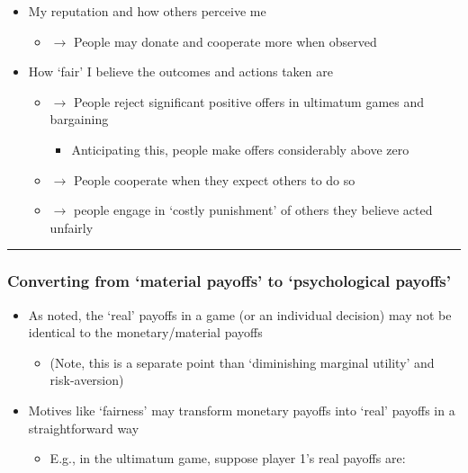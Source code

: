 \documentclass[]{article}
\providecommand{\tightlist}{%
  \setlength{\itemsep}{0pt}\setlength{\parskip}{0pt}}
\begin{document}
\begin{itemize}
\tightlist
\item
  My reputation and how others perceive me

  \begin{itemize}
  \tightlist
  \item
    \(\rightarrow\) People may donate and cooperate more when observed
  \end{itemize}
\item
  How `fair' I believe the outcomes and actions taken are

  \begin{itemize}
  \tightlist
  \item
    \(\rightarrow\) People reject significant positive offers in ultimatum games and bargaining

    \begin{itemize}
    \tightlist
    \item
      Anticipating this, people make offers considerably above zero
    \end{itemize}
  \item
    \(\rightarrow\) People cooperate when they expect others to do so
  \item
    \(\rightarrow\) people engage in `costly punishment' of others they believe acted unfairly
  \end{itemize}
\end{itemize}

\begin{center}\rule{0.5\linewidth}{\linethickness}\end{center}

\hypertarget{converting-from-material-payoffs-to-psychological-payoffs}{%
\subsubsection{Converting from `material payoffs' to `psychological payoffs'}\label{converting-from-material-payoffs-to-psychological-payoffs}}

\begin{itemize}
\tightlist
\item
  As noted, the `real' payoffs in a game (or an individual decision) may not be identical to the monetary/material payoffs

  \begin{itemize}
  \tightlist
  \item
    (Note, this is a separate point than `diminishing marginal utility' and risk-aversion)
  \end{itemize}
\item
  Motives like `fairness' may transform monetary payoffs into `real' payoffs in a straightforward way

  \begin{itemize}
  \tightlist
  \item
    E.g., in the ultimatum game, suppose player 1's real payoffs are:
  \end{itemize}
\end{itemize}
\end{document}
